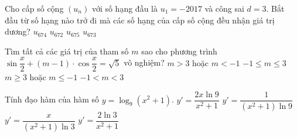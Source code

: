 \begin{ex}%
	Cho cấp số cộng $\left({u_n}\right)$ với số hạng đầu là $u_1=-2017$ và công sai $d=3$. Bắt đầu từ số hạng nào trở đi mà các số hạng của cấp số cộng đều nhận giá trị dương?
	\choice
	{\True $u_{674}$}
	{$u_{672}$}
	{$u_{675}$}
	{$u_{673}$}
\end{ex}
\begin{ex}%
	Tìm tất cả các giá trị của tham số $m$ sao cho phương trình $\sin \dfrac{x}{2}+\left({m-1}\right)\cdot\cos \dfrac{x}{2}=\sqrt{5}$ vô nghiệm?
	\choice
	{$m>3$ hoặc $m<-1$}
	{$-1\leqslant m\leqslant 3$}
	{$m\geqslant 3$ hoặc $m\leqslant -1$}
	{\True $-1<m<3$}
\end{ex}
\begin{ex}%
	Tính đạo hàm của hàm số $y=\log_9 (x^2+1)$.
	\choice
	{$y'=\dfrac{2x\ln 9}{x^2+1}$}
	{$y'=\dfrac{1}{(x^2+1)\ln 9}$}
	{\True $y'=\dfrac{x}{(x^2+1)\ln 3}$}
	{$y'=\dfrac{2\ln 3}{x^2+1}$}
\end{ex}
